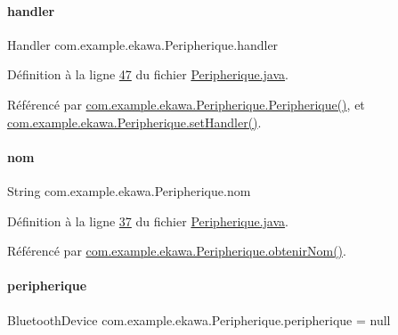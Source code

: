 \paragraph{\texorpdfstring{handler}{handler}}
{\footnotesize\ttfamily Handler com.\+example.\+ekawa.\+Peripherique.\+handler\hspace{0.3cm}{\ttfamily [private]}}



Définition à la ligne \hyperlink{_peripherique_8java_source_l00047}{47} du fichier \hyperlink{_peripherique_8java_source}{Peripherique.\+java}.



Référencé par \hyperlink{_peripherique_8java_source_l00052}{com.\+example.\+ekawa.\+Peripherique.\+Peripherique()}, et \hyperlink{_peripherique_8java_source_l00093}{com.\+example.\+ekawa.\+Peripherique.\+set\+Handler()}.

\mbox{\label{classcom_1_1example_1_1ekawa_1_1_peripherique_a0fb529bb80d55dd616821bce74a2af8c}} 
\paragraph{\texorpdfstring{nom}{nom}}
{\footnotesize\ttfamily String com.\+example.\+ekawa.\+Peripherique.\+nom\hspace{0.3cm}{\ttfamily [private]}}



Définition à la ligne \hyperlink{_peripherique_8java_source_l00037}{37} du fichier \hyperlink{_peripherique_8java_source}{Peripherique.\+java}.



Référencé par \hyperlink{_peripherique_8java_source_l00244}{com.\+example.\+ekawa.\+Peripherique.\+obtenir\+Nom()}.

\mbox{\label{classcom_1_1example_1_1ekawa_1_1_peripherique_ab509bd2180c53845197423813a97f025}} 
\paragraph{\texorpdfstring{peripherique}{peripherique}}
{\footnotesize\ttfamily Bluetooth\+Device com.\+example.\+ekawa.\+Peripherique.\+peripherique = null\hspace{0.3cm}{\ttfamily [private]}}



